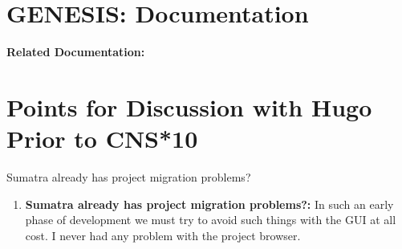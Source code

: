 \documentclass[12pt]{article}
\begin{document}
\section*{GENESIS: Documentation}

{\bf Related Documentation:}

\section*{Points for Discussion with Hugo Prior to CNS*10}

Sumatra already has project migration problems?

\begin{enumerate}
\item {\bf Sumatra already has project migration problems?:} In such an early phase of development we must try to avoid such things
with the GUI at all cost.  I never had any problem with the project browser.

\end{enumerate}
\end{document}
